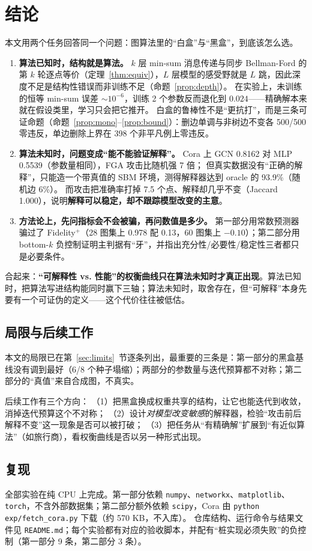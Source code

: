 \section{结论}\label{sec:conclusion}

本文用两个任务回答同一个问题：图算法里的“白盒”与“黑盒”，到底该怎么选。

\begin{enumerate}[leftmargin=1.8em]
\item \textbf{算法已知时，结构就是算法。} $k$ 层 min-sum 消息传递与同步 Bellman-Ford 的第 $k$ 轮逐点等价（定理~\ref{thm:equiv}），$L$ 层模型的感受野就是 $L$ 跳，因此深度不足是结构性错误而非训练不足（命题~\ref{prop:depth}）。
在实验上，未训练的恒等 min-sum 误差 $\sim10^{-6}$，训练 2 个参数反而退化到 $0.024$——精确解本来就在假设类里，学习只会把它推开。
白盒的鲁棒性不是“更抗打”，而是三条可证命题（命题~\ref{prop:mono}--\ref{prop:bound}）：删边单调与非树边不变各 500/500 零违反，单边删除上界在 398 个非平凡例上零违反。
\item \textbf{算法未知时，问题变成“能不能验证解释”。} Cora 上 GCN 0.8162 对 MLP 0.5539（参数量相同），FGA 攻击比随机强 7 倍；
但真实数据没有“正确的解释”，只能造一个带真值的 SBM 环境，测得解释器达到 oracle 的 93.9\%（随机边 6\%）。
而攻击把准确率打掉 7.5 个点、解释却几乎不变（Jaccard 1.000），说明\textbf{解释可以稳定，却不跟踪模型改变的主意}。
\item \textbf{方法论上，先问指标会不会被骗，再问数值是多少。} 第一部分用常数预测器骗过了 Fidelity$^+$（28 图集上 0.978 配 0.13，60 图集上 $-0.10$）；第二部分用 bottom-$k$ 负控制证明主判据有“牙”，并指出充分性/必要性/稳定性三者都只是必要条件。
\end{enumerate}

合起来：\textbf{“可解释性 vs. 性能”的权衡曲线只在算法未知时才真正出现}。算法已知时，把算法写进结构能同时赢下三轴；算法未知时，取舍存在，但“可解释”本身先要有一个可证伪的定义——这个代价往往被低估。

\subsection*{局限与后续工作}

本文的局限已在第~\ref{sec:limits}~节逐条列出，最重要的三条是：第一部分的黑盒基线没有调到最好（6/8 个种子塌缩）；两部分的参数量与迭代预算都不对称；第二部分的“真值”来自合成图，不真实。

后续工作有三个方向：
（1）把黑盒换成权重共享的结构，让它也能迭代到收敛，消掉迭代预算这个不对称；
（2）设计\emph{对模型改变敏感}的解释器，检验“攻击前后解释不变”这一现象是否可以被打破；
（3）把任务从“有精确解”扩展到“有近似算法”（如旅行商），看权衡曲线是否以另一种形式出现。

\subsection*{复现}

全部实验在纯 CPU 上完成。第一部分依赖 \texttt{numpy}、\texttt{networkx}、\texttt{matplotlib}、\texttt{torch}，不含外部数据集；第二部分额外依赖 \texttt{scipy}，Cora 由 \texttt{python exp/fetch\_cora.py} 下载（约 570 KB，不入库）。
仓库结构、运行命令与结果文件见 \texttt{README.md}；每个实验都有对应的验收脚本，并配有“桩实现必须失败”的负控制（第一部分 9 条，第二部分 3 条）。

